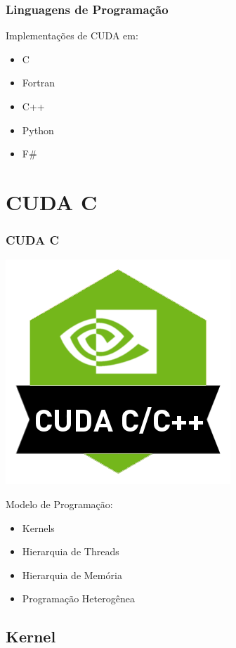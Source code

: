 \documentclass[10pt, compress]{beamer}
\begin{document}
\begin{frame}
    \frametitle{Linguagens de Programação}
    Implementações de CUDA em:
    \begin{itemize}
        \item \alert{C}
        \item Fortran
        \item C++
        \item Python
        \item F\#
    \end{itemize}
\end{frame}

\section{CUDA C}

\begin{frame}
    \frametitle{CUDA C}
    \begin{center}
        \includegraphics[width=.3\textwidth]{cuda-c}
    \end{center}
    Modelo de Programação:
    \begin{itemize}
        \item \alert{Kernels}
            \pause
        \item Hierarquia de \alert{Threads}
            \pause
        \item Hierarquia de \alert{Memória}
            \pause
        \item Programação \alert{Heterogênea}
    \end{itemize}
\end{frame}

\subsection{Kernel}
\end{document}
